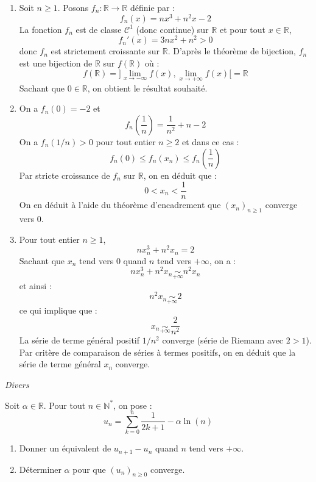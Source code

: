 \documentclass[a4paper,10pt]{report}
\begin{document}
\begin{enumerate}
\item Soit $n \geq 1$. Posons $f_n : \mathbb{R} \rightarrow \mathbb{R}$ définie par :
$$ f_n(x) = nx^3+n^2x-2$$
La fonction $f_n$ est de classe $\mathcal{C}^1$ (donc continue) sur $\mathbb{R}$ et pour tout $x \in \mathbb{R}$,
$$ f_n'(x) = 3nx^2 + n^2 >0$$
donc $f_n$ est strictement croissante sur $\mathbb{R}$. D'après le théorème de bijection, $f_n$ est une bijection de $\mathbb{R}$ sur $f(\mathbb{R})$ où :
$$ f(\mathbb{R}) =  ]\lim_{x \rightarrow - \infty} f(x), \lim_{x \rightarrow +\infty} f(x)[= \mathbb{R}$$
Sachant que $0 \in \mathbb{R}$, on obtient le résultat souhaité.
\item On a $f_n(0)=-2$ et 
$$ f_n \left( \dfrac{1}{n} \right) = \dfrac{1}{n^2} + n -2$$
On a $f_n(1/n)>0$ pour tout entier $n \geq 2$ et dans ce cas :
$$ f_n(0) \leq f_n(x_n) \leq f_n \left( \dfrac{1}{n} \right) $$
Par stricte croissance de $f_n$ sur $\mathbb{R}$, on en déduit que :
$$ 0 < x_n < \dfrac{1}{n}$$
On en déduit à l'aide du théorème d'encadrement que $(x_n)_{n \geq 1}$ converge vers $0$.
\item Pour tout entier $n \geq 1$,
$$ nx_n^3+n^2x_n=2$$
Sachant que $x_n$ tend vers $0$ quand $n$ tend vers $+ \infty$, on a :
$$ nx_n^3+n^2x_n \underset{+ \infty}{\sim} n^2 x_n$$
et ainsi :
$$ 
n^2 x_n \underset{+ \infty}{\sim} 2$$
ce qui implique que :
$$ x_n \underset{+ \infty}{\sim}  \dfrac{2}{n^2}$$
La série de terme général positif $1/n^2$ converge (série de Riemann avec $2>1$). Par critère de comparaison de séries à termes positifs, on en déduit que la série de terme général $x_n$ converge.
\end{enumerate}

\medskip


\begin{center}
\textit{{ {\large Divers}}}
\end{center}

\medskip

\begin{Exa} Soit $\alpha \in \mathbb{R}$. Pour tout $n \in \mathbb{N}^*$, on pose :
$$ u_n = \sum_{k=0}^n \frac{1}{2k+1} -  \alpha \ln(n)$$

\begin{enumerate}
\item Donner un équivalent de $u_{n+1}-u_n$ quand $n$ tend vers $+ \infty$.
\item Déterminer $\alpha$ pour que $(u_n)_{n \geq 0}$ converge.
\end{enumerate}
\end{Exa} 
\end{document}
